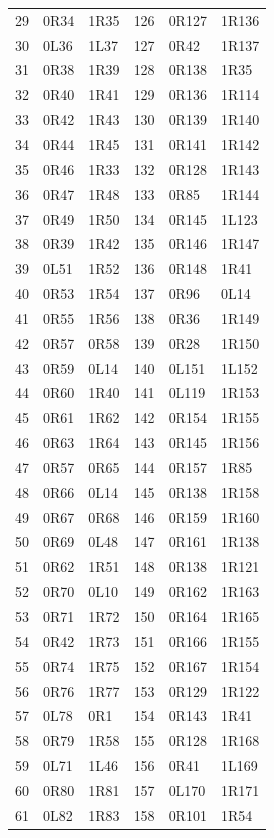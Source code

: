 \begin{longtable}{rll@{\hspace{10mm}}rll}
29 & 0R34 & 1R35 & 126 & 0R127 & 1R136\\
30 & 0L36 & 1L37 & 127 & 0R42 & 1R137\\
31 & 0R38 & 1R39 & 128 & 0R138 & 1R35\\
32 & 0R40 & 1R41 & 129 & 0R136 & 1R114\\
33 & 0R42 & 1R43 & 130 & 0R139 & 1R140\\
34 & 0R44 & 1R45 & 131 & 0R141 & 1R142\\
35 & 0R46 & 1R33 & 132 & 0R128 & 1R143\\
36 & 0R47 & 1R48 & 133 & 0R85 & 1R144\\
37 & 0R49 & 1R50 & 134 & 0R145 & 1L123\\
38 & 0R39 & 1R42 & 135 & 0R146 & 1R147\\
39 & 0L51 & 1R52 & 136 & 0R148 & 1R41\\
40 & 0R53 & 1R54 & 137 & 0R96 & 0L14\\
41 & 0R55 & 1R56 & 138 & 0R36 & 1R149\\
42 & 0R57 & 0R58 & 139 & 0R28 & 1R150\\
43 & 0R59 & 0L14 & 140 & 0L151 & 1L152\\
44 & 0R60 & 1R40 & 141 & 0L119 & 1R153\\
45 & 0R61 & 1R62 & 142 & 0R154 & 1R155\\
46 & 0R63 & 1R64 & 143 & 0R145 & 1R156\\
47 & 0R57 & 0R65 & 144 & 0R157 & 1R85\\
48 & 0R66 & 0L14 & 145 & 0R138 & 1R158\\
49 & 0R67 & 0R68 & 146 & 0R159 & 1R160\\
50 & 0R69 & 0L48 & 147 & 0R161 & 1R138\\
51 & 0R62 & 1R51 & 148 & 0R138 & 1R121\\
52 & 0R70 & 0L10 & 149 & 0R162 & 1R163\\
53 & 0R71 & 1R72 & 150 & 0R164 & 1R165\\
54 & 0R42 & 1R73 & 151 & 0R166 & 1R155\\
55 & 0R74 & 1R75 & 152 & 0R167 & 1R154\\
56 & 0R76 & 1R77 & 153 & 0R129 & 1R122\\
57 & 0L78 & 0R1 & 154 & 0R143 & 1R41\\
58 & 0R79 & 1R58 & 155 & 0R128 & 1R168\\
59 & 0L71 & 1L46 & 156 & 0R41 & 1L169\\
60 & 0R80 & 1R81 & 157 & 0L170 & 1R171\\
61 & 0L82 & 1R83 & 158 & 0R101 & 1R54\\

\end{longtable}
